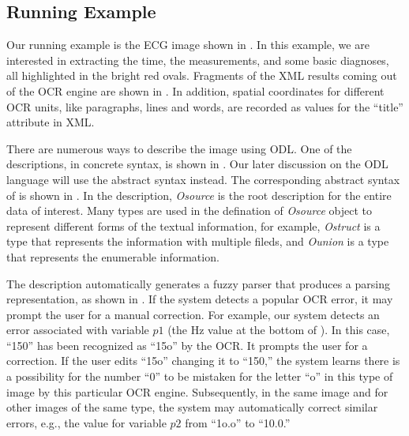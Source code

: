 \subsection{Running Example}
Our running example is the ECG image shown in . 
In this example, we are interested in extracting the time, the measurements, 
and some basic diagnoses, all highlighted in the bright red ovals.
Fragments of the XML results coming out of the OCR engine are shown 
in . In addition, spatial coordinates for different 
OCR units, like paragraphs, lines and words, are recorded as values  
for the ``title'' attribute in XML. 

There are numerous ways to describe the image using ODL.
One of the descriptions, in concrete syntax, is shown in 
. Our later discussion on the ODL language
will use the abstract syntax instead. 
The corresponding abstract syntax of 
is shown in . 
In the description, 
{\em Osource} is the root description for the entire data of interest. 
Many types are used in the defination of {\em Osource} object to represent 
different forms of the textual information, for example, {\em Ostruct} is a type that 
represents the information with multiple fileds, and {\em Ounion} is a 
type that represents the enumerable information. 







The description automatically generates a fuzzy parser 
that produces a parsing representation, as shown in . 
If the system detects a popular OCR error, it may prompt the user for a
manual correction. For example, our system detects an error associated with
variable $p1$ (the Hz value at the bottom of ). In
this case, ``150'' has been recognized as ``15o'' by the OCR.
It prompts the user for a correction. If the user edits 
``15o'' changing it to ``150,'' the system learns there is a possibility for the number ``0'' 
to be mistaken for the letter ``o'' in this type of image by this particular OCR engine.
Subsequently, in the same image and for other images of the same type, 
the system may automatically  correct similar errors, e.g., 
the value for variable $p2$ from ``1o.o'' to ``10.0.'' 

